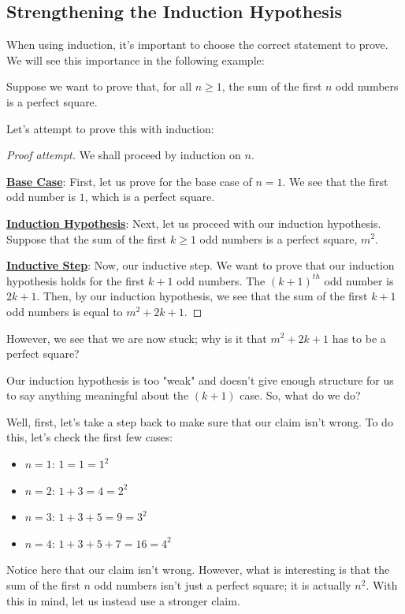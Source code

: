 \documentclass[openany]{book}
\renewcommand\qedsymbol{$\blacksquare$}
\begin{document}
\subsection{Strengthening the Induction Hypothesis} When using induction, it's important to choose the correct statement to prove. We will see this importance in the following example:

Suppose we want to prove that, for all $n\geq 1$, the sum of the first $n$ odd numbers is a perfect square.

Let's attempt to prove this with induction:
\begin{proof}[Proof attempt]\renewcommand{\qedsymbol}{$\boxtimes$}
	We shall proceed by induction on $n$.
	
	\textbf{\underline{Base Case}}: First, let us prove for the base case of $n=1$. We see that the first odd number is $1$, which is a perfect square.
	
	\textbf{\underline{Induction Hypothesis}}: Next, let us proceed with our induction hypothesis. Suppose that the sum of the first $k\geq1$ odd numbers is a perfect square, $m^2$.
	
	\textbf{\underline{Inductive Step}}: Now, our inductive step. We want to prove that our induction hypothesis holds for the first $k+1$ odd numbers. The $(k+1)^{th}$ odd number is $2k+1$. Then, by our induction hypothesis, we see that the sum of the first $k+1$ odd numbers is equal to $m^2+2k+1$.
\end{proof}

However, we see that we are now stuck; why is it that $m^2+2k+1$ has to be a perfect square?

Our induction hypothesis is too "weak" and doesn't give enough structure for us to say anything meaningful about the $(k+1)$ case. So, what do we do?

Well, first, let's take a step back to make sure that our claim isn't wrong. To do this, let's check the first few cases:

\begin{itemize}
	\item $n=1$: $1=1=1^2$
	\item $n=2$: $1+3=4=2^2$
	\item $n=3$: $1+3+5=9=3^2$
	\item $n=4$: $1+3+5+7=16=4^2$
\end{itemize}

Notice here that our claim isn't wrong. However, what is interesting is that the sum of the first $n$ odd numbers isn't just a perfect square; it is actually $n^2$. With this in mind, let us instead use a stronger claim.
\end{document}
